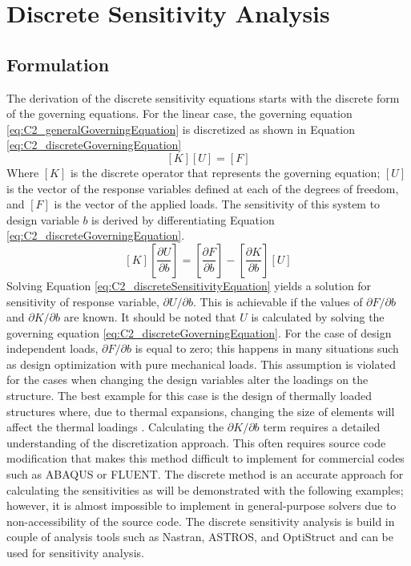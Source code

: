 \section{Discrete Sensitivity Analysis}
\subsection{Formulation}
The derivation of the discrete sensitivity equations starts with the discrete form of the governing equations. For the linear case, the governing equation \eqref{eq:C2_generalGoverningEquation} is discretized as shown in Equation \eqref{eq:C2_discreteGoverningEquation}
%
\begin{equation}\label{eq:C2_discreteGoverningEquation}
    \left[ K \right] \left[ U \right] = \left[ F \right]
\end{equation}
%
Where $[K]$ is the discrete operator that represents the governing equation; $[U]$ is the vector of the response variables defined at each of the degrees of freedom, and $[F]$ is the vector of the applied loads. The sensitivity of this system to design variable $b$ is derived by differentiating Equation \eqref{eq:C2_discreteGoverningEquation}.
%
\begin{equation}\label{eq:C2_discreteSensitivityEquation}
    \left[ K \right] \left[ \frac{\partial U}{\partial b} \right] = 
    \left[ \frac{\partial F}{\partial b} \right] - 
    \left[ \frac{\partial K}{\partial b} \right] \left[ U \right]
\end{equation}
%
Solving Equation \eqref{eq:C2_discreteSensitivityEquation} yields a solution for sensitivity of response variable, $\partial U/\partial b$. This is achievable if the values of $\partial F/\partial b$ and $\partial K/\partial b$ are known. It should be noted that $U$ is calculated by solving the governing equation \eqref{eq:C2_discreteGoverningEquation}. For the case of design independent loads, $\partial F/\partial b$ is equal to zero; this happens in many situations such as design optimization with pure mechanical loads. This assumption is violated for the cases when changing the design variables alter the loadings on the structure. The best example for this case is the design of thermally loaded structures where, due to thermal expansions, changing the size of elements will affect the thermal loadings \cite{deaton2013stiffening}. Calculating the $\partial K/\partial b$ term requires a detailed understanding of the discretization approach. This often requires source code modification that makes this method difficult to implement for commercial codes such as ABAQUS or FLUENT. The discrete method is an accurate approach for calculating the sensitivities as will be demonstrated with the following examples; however, it is almost impossible to implement in general-purpose solvers due to non-accessibility of the source code. The discrete sensitivity analysis is build in couple of analysis tools such as Nastran, ASTROS, and OptiStruct and can be used for sensitivity analysis.
